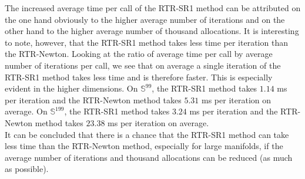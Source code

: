 The increased average time per call of the RTR-SR1 method can be attributed on the one hand obviously to the higher average number of iterations and on the other hand to the higher average number of thousand allocations. It is interesting to note, however, that the RTR-SR1 method takes less time per iteration than the RTR-Newton. Looking at the ratio of average time per call by average number of iterations per call, we see that on average a single iteration of the RTR-SR1 method takes less time and is therefore faster. This is especially evident in the higher dimensions. On $\mathbb{S}^{99}$, the RTR-SR1 method takes $1.14$ ms per iteration and the RTR-Newton method takes $5.31$ ms per iteration on average. On $\mathbb{S}^{199}$, the RTR-SR1 method takes $3.24$ ms per iteration and the RTR-Newton method takes $23.38$ ms per iteration on average. \\
It can be concluded that there is a chance that the RTR-SR1 method can take less time than the RTR-Newton method, especially for large manifolds, if the average number of iterations and thousand allocations can be reduced (as much as possible).
